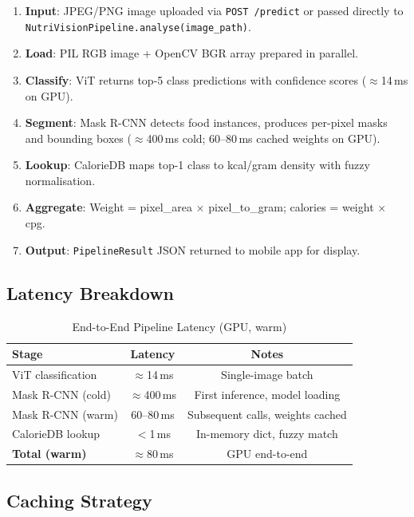 \documentclass[fleqn,10pt]{SelfArx}
\begin{document}
\begin{enumerate}[noitemsep]
    \item \textbf{Input}: JPEG/PNG image uploaded via \texttt{POST /predict} or passed directly to \texttt{NutriVisionPipeline.analyse(image\_path)}.
    \item \textbf{Load}: PIL RGB image + OpenCV BGR array prepared in parallel.
    \item \textbf{Classify}: ViT returns top-5 class predictions with confidence scores ($\approx$14\,ms on GPU).
    \item \textbf{Segment}: Mask R-CNN detects food instances, produces per-pixel masks and bounding boxes ($\approx$400\,ms cold; 60--80\,ms cached weights on GPU).
    \item \textbf{Lookup}: CalorieDB maps top-1 class to kcal/gram density with fuzzy normalisation.
    \item \textbf{Aggregate}: Weight = pixel\_area $\times$ pixel\_to\_gram; calories = weight $\times$ cpg.
    \item \textbf{Output}: \texttt{PipelineResult} JSON returned to mobile app for display.
\end{enumerate}

\subsection{Latency Breakdown}

\begin{table}[!htb]
\centering
\caption{End-to-End Pipeline Latency (GPU, warm)}
\label{tab:latency}
\small
\begin{tabular}{@{}lcc@{}}
\toprule
\textbf{Stage}        & \textbf{Latency} & \textbf{Notes} \\
\midrule
ViT classification    & $\approx$14\,ms  & Single-image batch \\
Mask R-CNN (cold)     & $\approx$400\,ms & First inference, model loading \\
Mask R-CNN (warm)     & 60--80\,ms       & Subsequent calls, weights cached \\
CalorieDB lookup      & $<$1\,ms         & In-memory dict, fuzzy match \\
\textbf{Total (warm)} & $\approx$80\,ms  & GPU end-to-end \\
\bottomrule
\end{tabular}
\end{table}

\subsection{Caching Strategy}
\end{document}
